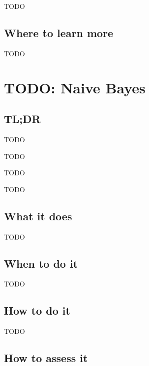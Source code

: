 \documentclass[
]{book}
\providecommand{\tightlist}{%
  \setlength{\itemsep}{0pt}\setlength{\parskip}{0pt}}
\begin{document}
TODO

\hypertarget{where-to-learn-more-4}{%
\section{Where to learn more}\label{where-to-learn-more-4}}

TODO

\hypertarget{naive-bayes}{%
\chapter{TODO: Naive Bayes}\label{naive-bayes}}

\hypertarget{tldr-5}{%
\section{TL;DR}\label{tldr-5}}

\begin{description}
\tightlist
\item[What it does]
TODO
\item[When to do it]
TODO
\item[How to do it]
TODO
\item[How to assess it]
TODO
\end{description}

\hypertarget{what-it-does-5}{%
\section{What it does}\label{what-it-does-5}}

TODO

\hypertarget{when-to-do-it-5}{%
\section{When to do it}\label{when-to-do-it-5}}

TODO

\hypertarget{how-to-do-it-5}{%
\section{How to do it}\label{how-to-do-it-5}}

TODO

\hypertarget{how-to-assess-it-5}{%
\section{How to assess it}\label{how-to-assess-it-5}}
\end{document}
